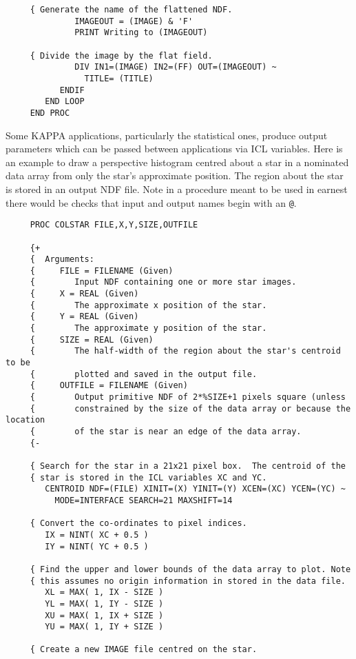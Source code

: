 {\begin{verbatim}
     { Generate the name of the flattened NDF.
              IMAGEOUT = (IMAGE) & 'F'
              PRINT Writing to (IMAGEOUT) 

     { Divide the image by the flat field.
              DIV IN1=(IMAGE) IN2=(FF) OUT=(IMAGEOUT) ~
                TITLE= (TITLE)
           ENDIF
        END LOOP
     END PROC
\end{verbatim}
\normalsize
Some {\small KAPPA} applications, particularly the statistical ones,
produce output parameters which can be passed between applications via
{\small ICL} variables. Here is an example to draw a
perspective histogram centred about a star in a nominated data array
from only the star's approximate position. The region about the star is
stored in an output NDF file. Note in a procedure meant to be used in
earnest there would be checks that input and output names begin with an
{\tt @}.

\small
\begin{verbatim}
     PROC COLSTAR FILE,X,Y,SIZE,OUTFILE

     {+
     {  Arguments:
     {     FILE = FILENAME (Given)
     {        Input NDF containing one or more star images.
     {     X = REAL (Given)
     {        The approximate x position of the star.
     {     Y = REAL (Given)
     {        The approximate y position of the star.
     {     SIZE = REAL (Given)
     {        The half-width of the region about the star's centroid to be
     {        plotted and saved in the output file.
     {     OUTFILE = FILENAME (Given)
     {        Output primitive NDF of 2*%SIZE+1 pixels square (unless
     {        constrained by the size of the data array or because the location
     {        of the star is near an edge of the data array.
     {-

     { Search for the star in a 21x21 pixel box.  The centroid of the
     { star is stored in the ICL variables XC and YC.
        CENTROID NDF=(FILE) XINIT=(X) YINIT=(Y) XCEN=(XC) YCEN=(YC) ~
          MODE=INTERFACE SEARCH=21 MAXSHIFT=14

     { Convert the co-ordinates to pixel indices.
        IX = NINT( XC + 0.5 )
        IY = NINT( YC + 0.5 )

     { Find the upper and lower bounds of the data array to plot. Note
     { this assumes no origin information in stored in the data file.
        XL = MAX( 1, IX - SIZE )
        YL = MAX( 1, IY - SIZE )
        XU = MAX( 1, IX + SIZE )
        YU = MAX( 1, IY + SIZE )

     { Create a new IMAGE file centred on the star.


\end{verbatim}}
